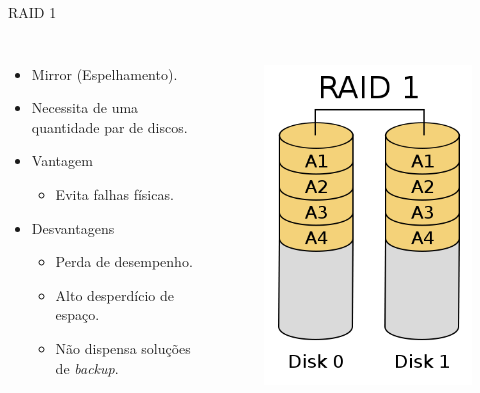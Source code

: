 \begin{frame}{RAID 1}
	\begin{columns}
		\begin{itemize}
			\item Mirror (Espelhamento).
			\item Necessita de uma quantidade par de discos.
			\item Vantagem
			\begin{itemize}
				\item Evita falhas físicas.
			\end{itemize}
			\item Desvantagens
			\begin{itemize}
				\item Perda de desempenho.
				\item Alto desperdício de espaço.
				\item  Não dispensa soluções de \textit{backup}.
			\end{itemize}
		\end{itemize}
		
		\begin{figure}
			\includegraphics[width=\textwidth]{imagens/RAID_1}
			\label{fig:exemplo}
		\end{figure}
		
	\end{columns}
\end{frame}

